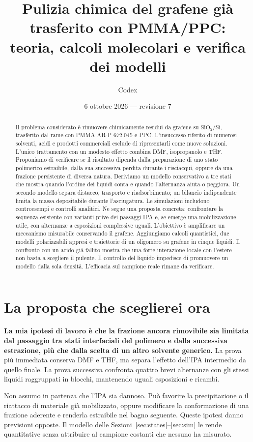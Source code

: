 \documentclass[11pt,reqno]{amsart}
\title[Grafene: teoria e calcoli molecolari della pulizia]{Pulizia chimica del grafene gi\`a trasferito con PMMA/PPC:\\ teoria, calcoli molecolari e verifica dei modelli}
\author{Codex}
\date{6 ottobre 2026 --- revisione 7}
\numberwithin{equation}{section}
\newcommand{\SiO}{\ensuremath{\mathrm{SiO}_2}}
\begin{document}
\begin{abstract}
Il problema considerato \`e rimuovere chimicamente residui da grafene
su \SiO/Si, trasferito dal rame con PMMA AR-P 672.045 e PPC.
L'insuccesso riferito di numerosi solventi, acidi e prodotti commerciali
esclude di ripresentarli come nuove soluzioni. L'unico trattamento con
un modesto effetto combina DMF, isopropanolo e THF. Proponiamo di
verificare se il risultato dipenda dalla preparazione di uno stato
polimerico estraibile, dalla sua successiva perdita durante i
risciacqui, oppure da una frazione persistente di diversa natura.
Deriviamo un modello conservativo a tre stati che mostra quando
l'ordine dei liquidi conta e quando l'alternanza aiuta o peggiora.
Un secondo modello separa distacco, trasporto e riadsorbimento;
un bilancio indipendente limita la massa depositabile durante
l'asciugatura. Le simulazioni includono controesempi e controlli
analitici. Ne segue una proposta concreta: confrontare la sequenza
esistente con varianti prive dei passaggi IPA e, se emerge una
mobilizzazione utile, con alternanze a esposizioni complessive uguali.
L'obiettivo \`e amplificare un meccanismo misurabile conservando il
grafene. Aggiungiamo calcoli quantistici, due modelli polarizzabili appresi e traiettorie di un oligomero su grafene in cinque liquidi. Il confronto con un acido gi\`a fallito mostra che una forte interazione locale con l'estere non basta a scegliere il pulente. Il controllo del liquido impedisce di promuovere un modello dalla sola densit\`a. L'efficacia sul campione reale rimane da verificare.
\end{abstract}
\maketitle

\section{La proposta che sceglierei ora}

\textbf{La mia ipotesi di lavoro \`e che la frazione ancora rimovibile
sia limitata dal passaggio tra stati interfaciali del polimero e dalla
successiva estrazione, pi\`u che dalla scelta di un altro solvente
generico.} La prova pi\`u immediata conserva DMF e THF, ma separa
l'effetto dell'IPA intermedio da quello finale. La prova successiva
confronta quattro brevi alternanze con gli stessi liquidi raggruppati
in blocchi, mantenendo uguali esposizioni e ricambi.

Non assumo in partenza che l'IPA sia dannoso. Pu\`o favorire la
precipitazione o il riattacco di materiale gi\`a mobilizzato, oppure
modificare la conformazione di una frazione aderente e renderla
estraibile nel bagno seguente. Queste ipotesi danno previsioni
opposte. Il modello delle Sezioni~\ref{sec:states}--\ref{sec:sim}
le rende quantitative senza attribuire al campione costanti che
nessuno ha misurato.
\end{document}
